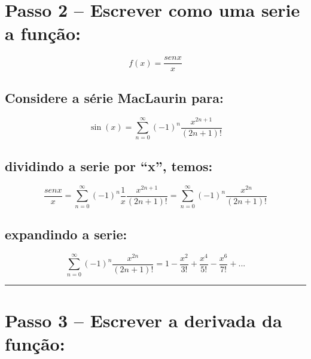 \documentclass[11pt]{article}
\begin{document}
    \hypertarget{passo-2-escrever-como-uma-serie-a-funuxe7uxe3o}{%
\section{Passo 2 -- Escrever como uma serie a
função:}\label{passo-2-escrever-como-uma-serie-a-funuxe7uxe3o}}

\begin{equation*}
f(x)   = \frac{senx}{x}
\end{equation*}

    \hypertarget{considere-a-suxe9rie-maclaurin-para}{%
\subsection{Considere a série MacLaurin
para:}\label{considere-a-suxe9rie-maclaurin-para}}

\begin{equation*}
\sin (x) = \sum_{n=0}^\infty (-1)^n \frac{x^{2n+1}}{(2n+1)!}
\end{equation*}

\hypertarget{dividindo-a-serie-por-x-temos}{%
\subsection{dividindo a serie por ``x'',
temos:}\label{dividindo-a-serie-por-x-temos}}

\begin{equation*}
\frac{senx}{x} = \sum_{n=0}^\infty (-1)^n \frac{1}{x} \frac{x^{2n+1}}{(2n+1)!} = \sum_{n=0}^\infty (-1)^n \frac{x^{2n}}{(2n+1)!}
\end{equation*}

\hypertarget{expandindo-a-serie}{%
\subsection{expandindo a serie:}\label{expandindo-a-serie}}

\begin{equation*}
\sum_{n=0}^\infty (-1)^n \frac{x^{2n}}{(2n+1)!} = 1 - \frac{x^2}{3!} + \frac{x^4}{5!} -\frac{x^6}{7!} + ...
\end{equation*}

    \begin{center}\rule{0.5\linewidth}{\linethickness}\end{center}

    \hypertarget{passo-3-escrever-a-derivada-da-funuxe7uxe3o}{%
\section{Passo 3 -- Escrever a derivada da
função:}\label{passo-3-escrever-a-derivada-da-funuxe7uxe3o}}
\end{document}
